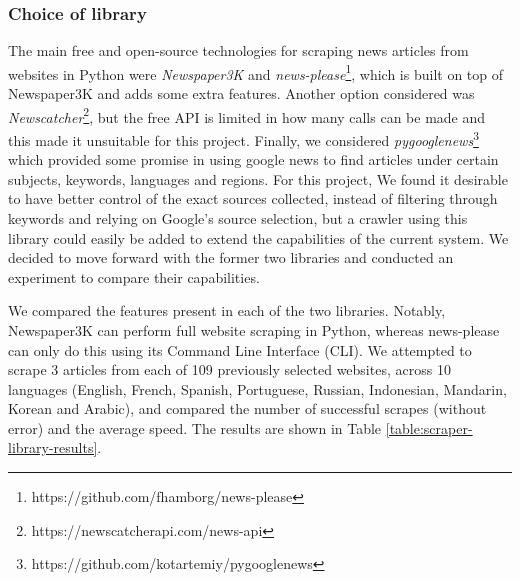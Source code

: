\documentclass{l4proj}
\begin{document}
\subsubsection{Choice of library} \hfill \par
The main free and open-source technologies for scraping news articles from websites in Python were \emph{Newspaper3K} and \emph{news-please}\footnote{https://github.com/fhamborg/news-please}, which is built on top of Newspaper3K and adds some extra features. Another option considered was \emph{Newscatcher}\footnote{https://newscatcherapi.com/news-api}, but the free API is limited in how many calls can be made and this made it unsuitable for this project. Finally, we considered \emph{pygooglenews}\footnote{https://github.com/kotartemiy/pygooglenews} which provided some promise in using google news to find articles under certain subjects, keywords, languages and regions. For this project, We found it desirable to have better control of the exact sources collected, instead of filtering through keywords and relying on Google's source selection, but a crawler using this library could easily be added to extend the capabilities of the current system. We decided to move forward with the former two libraries and conducted an experiment to compare their capabilities. \par

We compared the features present in each of the two libraries. Notably, Newspaper3K can perform full website scraping in Python, whereas news-please can only do this using its Command Line Interface (CLI). We attempted to scrape 3 articles from each of 109 previously selected websites, across 10 languages (English, French, Spanish, Portuguese, Russian, Indonesian, Mandarin, Korean and Arabic), and compared the number of successful scrapes (without error) and the average speed. The results are shown in Table \ref{table:scraper-library-results}. \par 
\end{document}
